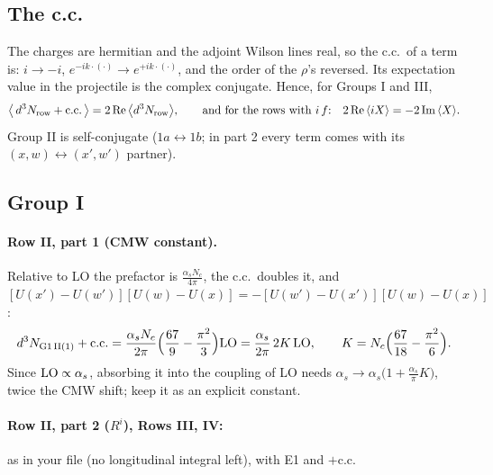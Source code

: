 \documentclass[10pt]{article}
\numberwithin{equation}{section}
\newcommand{\LO}{{\rm LO}}
\begin{document}
\subsection{The c.c.}
The charges are hermitian and the adjoint Wilson lines real, so the c.c.\ of a term is: $i\to-i$, $e^{-ik\cdot(\cdot)}\to e^{+ik\cdot(\cdot)}$, and the order of the $\rho$'s reversed. Its expectation value in the projectile is the complex conjugate. Hence, for Groups I and III,
\begin{equation}
\big\langle\,d^3N_{\rm row}+{\rm c.c.}\,\big\rangle=2\,{\rm Re}\,\big\langle d^3N_{\rm row}\big\rangle,\qquad\text{and for the rows with }i\,f\text{:}\quad 2\,{\rm Re}\,\langle i X\rangle=-2\,{\rm Im}\,\langle X\rangle .
\end{equation}
Group II is self-conjugate ($1a\leftrightarrow1b$; in part 2 every term comes with its $(x,w)\leftrightarrow(x',w')$ partner).

\subsection{Group I}
\paragraph{Row II, part 1 (CMW constant).} Relative to LO the prefactor is $\frac{\alpha_sN_c}{4\pi}$, the c.c.\ doubles it, and $[U(x')-U(w')][U(w)-U(x)]=-[U(w')-U(x')][U(w)-U(x)]$:
\begin{equation}
d^3N_{\rm G1\,II(1)}+{\rm c.c.}=\frac{\alpha_sN_c}{2\pi}\Big(\frac{67}{9}-\frac{\pi^2}{3}\Big)\LO=\frac{\alpha_s}{2\pi}\,2K\,\LO,\qquad K=N_c\Big(\frac{67}{18}-\frac{\pi^2}{6}\Big).\label{LT:eq:cmw}
\end{equation}
Since $\LO\propto\alpha_s$, absorbing it into the coupling of LO needs $\alpha_s\to\alpha_s\big(1+\frac{\alpha_s}{\pi}K\big)$, twice the CMW shift; keep it as an explicit constant.

\paragraph{Row II, part 2 ($R^i$), Rows III, IV:} as in your file (no longitudinal integral left), with E1 and $+$c.c.
\end{document}
